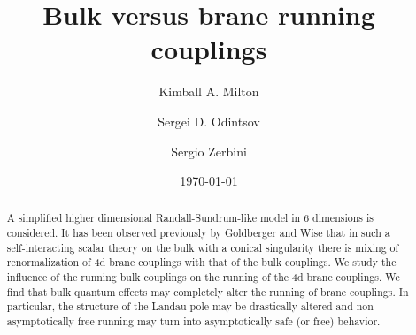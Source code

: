 \documentclass[a4paper,aps,prl,preprint,groupedaddress,showpacs,nobibnotes,tightenlines]{revtex4}
\begin{document}


\title{Bulk versus brane running couplings}


\author{Kimball A. Milton}



\author{Sergei D.  Odintsov}

\author{Sergio Zerbini}



\date{\today}

\begin{abstract}
A simplified higher dimensional Randall-Sundrum-like model in 6 
dimensions is 
considered. It has been observed previously by Goldberger and Wise that
 in such a self-interacting scalar theory on the bulk with a conical 
singularity there is mixing of renormalization of 4d brane couplings 
 with that of the bulk couplings.
We study the influence of the running bulk couplings on the running of the
4d brane couplings.  We find that bulk quantum effects may 
completely alter the running of brane couplings. In particular, the 
structure of the Landau 
pole may be drastically altered and  non-asymptotically free running may turn 
into asymptotically safe (or free) behavior.
\end{abstract}





\maketitle
\end{document}
